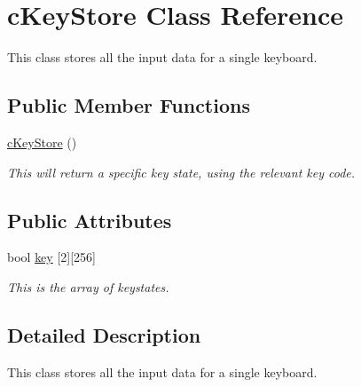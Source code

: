 \hypertarget{classc_key_store}{
\section{cKeyStore Class Reference}
\label{classc_key_store}
}


This class stores all the input data for a single keyboard.  


\subsection*{Public Member Functions}
\begin{DoxyCompactItemize}
\item 
\hypertarget{classc_key_store_a338766086dd09a48b8cefd33fb35bc7a}{
\hyperlink{classc_key_store_a338766086dd09a48b8cefd33fb35bc7a}{cKeyStore} ()}
\label{classc_key_store_a338766086dd09a48b8cefd33fb35bc7a}

\begin{DoxyCompactList}\small\item\em This will return a specific key state, using the relevant key code. \end{DoxyCompactList}\end{DoxyCompactItemize}
\subsection*{Public Attributes}
\begin{DoxyCompactItemize}
\item 
\hypertarget{classc_key_store_a1b0760ec36eafb3c3ef74b21e60e4009}{
bool \hyperlink{classc_key_store_a1b0760ec36eafb3c3ef74b21e60e4009}{key} \mbox{[}2\mbox{]}\mbox{[}256\mbox{]}}
\label{classc_key_store_a1b0760ec36eafb3c3ef74b21e60e4009}

\begin{DoxyCompactList}\small\item\em This is the array of keystates. \end{DoxyCompactList}\end{DoxyCompactItemize}


\subsection{Detailed Description}
This class stores all the input data for a single keyboard. 